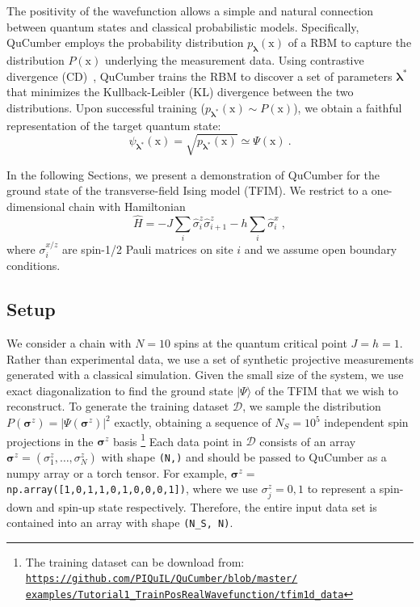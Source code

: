 \documentclass[submission, Phys, hidelinks]{SciPost}
\begin{document}
	The positivity of the wavefunction allows a simple and natural connection between quantum states and classical probabilistic models. Specifically, QuCumber employs the probability distribution $p_{\bm{\lambda}}(\bm{\mathrm{x}})$ of a RBM to capture the distribution $P(\bm{\mathrm{x}})$ underlying the measurement data. Using contrastive divergence (CD)~\cite{hinton2002training}, QuCumber trains the RBM to discover a set of parameters $\bm{\lambda}^*$ that minimizes the Kullback-Leibler (KL) divergence between the two distributions. Upon successful training ($p_{\bm{\lambda}^*}(\bm{\mathrm{x}})\sim P(\bm{\mathrm{x}})$), we obtain a faithful representation of the target quantum state:
	\begin{equation}
	\psi_{\bm{\lambda}^*}(\bm{\mathrm{x}})= \sqrt{p_{\bm{\lambda}^*}(\bm{\mathrm{x}})}
	\simeq\Psi(\bm{\mathrm{x}})\:.
	\label{wfpd}
	\end{equation} 

	In the following Sections, we present a demonstration of QuCumber for the ground state of the transverse-field Ising model (TFIM). We restrict to a one-dimensional chain with Hamiltonian
	\begin{equation}
		\hat{H} = -J\sum_i \hat{\sigma}^z_i \hat{\sigma}^z_{i+1} - h \sum_i\hat{\sigma}^x_i\:, \label{TFIM}
	\end{equation}
	where $\sigma^{x/z}_i$ are spin-1/2 Pauli matrices on site $i$ and we assume open boundary conditions.

	\subsection{Setup}\label{subsec:example}
		We consider a chain with $N=10$ spins at the quantum critical point $J=h=1$. Rather than experimental data, we use a set of synthetic projective measurements generated with a classical simulation. Given the small size of the system, we use exact diagonalization to find the ground state $|\Psi\rangle$ of the TFIM that we wish to reconstruct. To generate the training dataset $\mathcal{D}$, we sample the distribution $P(\bm{\sigma}^z)=|\Psi(\bm{\sigma}^z)|^2$ exactly, obtaining a sequence of $N_S=10^5$ independent spin projections in the $\bm{\sigma}^z$ basis
		\footnote{The training dataset can be download from: 
			\href{https://github.com/PIQuIL/QuCumber/blob/master/examples/Tutorial1_TrainPosRealWavefunction/tfim1d_data.txt}{\texttt{https://github.com/PIQuIL/QuCumber/blob/master/\\examples/Tutorial1\_TrainPosRealWavefunction/tfim1d\_data}}
		}
		Each data point in $\mathcal{D}$ consists of an array $\bm{\sigma}^z=(\sigma^z_1,\dots,\sigma^z_N)$ with shape \verb|(N,)| and should be passed to QuCumber as a numpy array or a torch tensor. For example, $\bm{\sigma}^z=$ \verb|np.array([1,0,1,1,0,1,0,0,0,1])|, where we use $\sigma_j^z=0,1$ to represent a spin-down and spin-up state respectively. Therefore, the entire input data set is contained into an array with shape \verb|(N_S, N)|.
\end{document}
